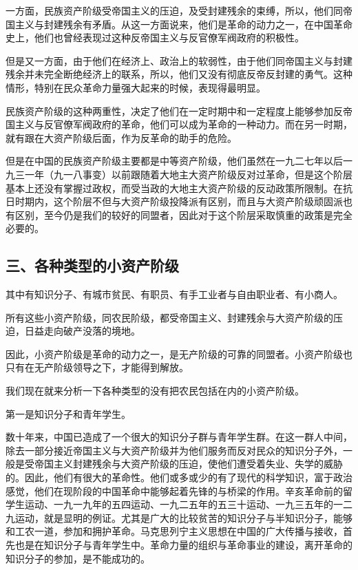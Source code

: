 一方面，民族资产阶级受帝国主义的压迫，及受封建残余的束缚，所以，他们同帝国主义与封建残余有矛盾。从这一方面说来，他们是革命的动力之一，在中国革命史上，他们也曾经表现过这种反帝国主义与反官僚军阀政府的积极性。

但是又一方面，由于他们在经济上、政治上的软弱性，由于他们同帝国主义与封建残余并未完全断绝经济上的联系，所以，他们又没有彻底反帝反封建的勇气。这种情形，特别在民众革命力量强大起来的时候，表现得最明显。

民族资产阶级的这种两重性，决定了他们在一定时期中和一定程度上能够参加反帝国主义与反官僚军阀政府的革命，他们可以成为革命的一种动力。而在另一时期，就有跟在大资产阶级后面，作为反革命的助手的危险。

但是在中国的民族资产阶级主要都是中等资产阶级，他们虽然在一九二七年以后一九三一年（九一八事变）以前跟随着大地主大资产阶级反对过革命，但是这个阶层基本上还没有掌握过政权，而受当政的大地主大资产阶级的反动政策所限制。在抗日时期内，这个阶层不但与大资产阶级投降派有区别，而且与大资产阶级顽固派也有区别，至今仍是我们的较好的同盟者，因此对于这个阶层采取慎重的政策是完全必要的。

\subsection{三、各种类型的小资产阶级}

其中有知识分子、有城市贫民、有职员、有手工业者与自由职业者、有小商人。

所有这些小资产阶级，同农民阶级，都受帝国主义、封建残余与大资产阶级的压迫，日益走向破产没落的境地。

因此，小资产阶级是革命的动力之一，是无产阶级的可靠的同盟者。小资产阶级也只有在无产阶级领导之下，才能得到解放。

我们现在就来分析一下各种类型的没有把农民包括在内的小资产阶级。

第一是知识分子和青年学生。

数十年来，中国已造成了一个很大的知识分子群与青年学生群。在这一群人中间，除去一部分接近帝国主义与大资产阶级并为他们服务而反对民众的知识分子外，一般是受帝国主义封建残余与大资产阶级的压迫，使他们遭受着失业、失学的威胁的。因此，他们有很大的革命性。他们或多或少的有了现代的科学知识，富于政治感觉，他们在现阶段的中国革命中能够起着先锋的与桥梁的作用。辛亥革命前的留学生运动、一九一九年的五四运动、一九二五年的五三十运动、一九三五年的一二九运动，就是显明的例证。尤其是广大的比较贫苦的知识分子与半知识分子，能够和工农一道，参加和拥护革命。马克思列宁主义思想在中国的广大传播与接收，首先也是在知识分子与青年学生中。革命力量的组织与革命事业的建设，离开革命的知识分子的参加，是不能成功的。

